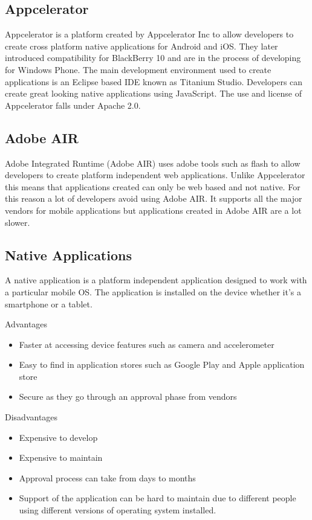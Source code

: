 \newpage
\subsection{Appcelerator}

Appcelerator is a platform created by Appcelerator Inc to allow developers to
create cross platform native applications for Android and iOS. They later
introduced compatibility for BlackBerry 10 and are in the process of developing
for Windows Phone. The main development environment used to create applications
is an Eclipse based IDE known as Titanium Studio. Developers can create great
looking native applications  using JavaScript. The use and license of 
Appcelerator falls under Apache 2.0.

\subsection{Adobe AIR}

Adobe Integrated Runtime (Adobe AIR) uses adobe tools such as flash to allow
developers to create platform independent web applications. Unlike Appcelerator
this means that applications created can only be web based and not native. For
this reason a lot of developers avoid using Adobe AIR. It supports all the major
vendors for mobile applications but applications created in Adobe AIR are a lot
slower.


\newpage
\subsection{Native Applications}

A native application is a platform independent application designed to work with
a particular mobile OS. The application is installed on the device whether it's
a smartphone or a tablet.

Advantages

\begin{itemize}
  \item Faster at accessing device features such as camera and accelerometer
  \item Easy to find in application stores such as Google Play and Apple 
        application store
  \item Secure as they go through an approval phase from vendors
\end{itemize}


Disadvantages

\begin{itemize}
  \item Expensive to develop
  \item Expensive to maintain
  \item Approval process can take from days to months
  \item Support of the application can be hard to maintain due to different 
        people using different versions of operating system installed.
\end{itemize}


